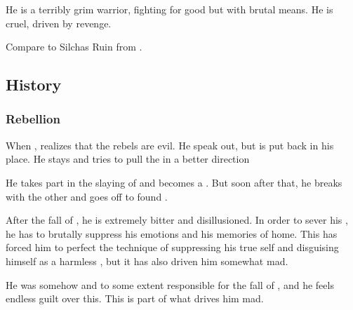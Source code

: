 He is a terribly grim warrior, fighting for good but with brutal means. 
He is cruel, driven by revenge. 

Compare to Silchas Ruin from \cite{StevenErikson:ReapersGale}.









\subsection{History}





\subsubsection{Rebellion}
When , \Sithiyacaan{} realizes that the rebels are evil. He speak out, but is put back in his place. He stays and tries to pull the  in a better direction

He takes part in the slaying of \Nexagglachel{} and becomes a \sathariah. But soon after that, he breaks with the other \resphain{} and goes off to found \Kezerad.

After the fall of \Kezerad, he is extremely bitter and disillusioned. In order to sever his , he has to brutally suppress his emotions and his memories of home. This has forced him to perfect the technique of suppressing his true self and disguising himself as a harmless \human, but it has also driven him somewhat mad. 

He was somehow and to some extent responsible for the fall of \Kezerad, and he feels endless guilt over this. This is part of what drives him mad.


